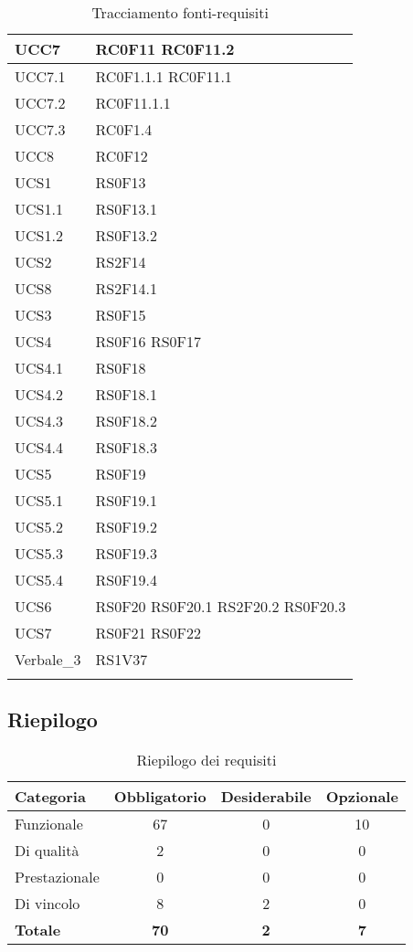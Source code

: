 \begin{center}
\begin{longtable}{|p{5cm}|p{5cm}|}
UCC7		& RC0F11 \newline RC0F11.2 \\\hline
UCC7.1		& RC0F1.1.1 \newline RC0F11.1 \\\hline
UCC7.2		& RC0F11.1.1 \\\hline
UCC7.3		& RC0F1.4 \\\hline
UCC8		& RC0F12 \\\hline
UCS1		& RS0F13 \\\hline
UCS1.1		& RS0F13.1 \\\hline
UCS1.2		& RS0F13.2 \\\hline
UCS2		& RS2F14 \\\hline
UCS8		& RS2F14.1 \\\hline
UCS3		& RS0F15 \\\hline
UCS4		& RS0F16 \newline RS0F17 \\\hline
UCS4.1		& RS0F18 \\\hline
UCS4.2		& RS0F18.1 \\\hline
UCS4.3		& RS0F18.2 \\\hline
UCS4.4		& RS0F18.3 \\\hline
UCS5		& RS0F19 \\\hline
UCS5.1		& RS0F19.1 \\\hline
UCS5.2		& RS0F19.2 \\\hline
UCS5.3		& RS0F19.3 \\\hline
UCS5.4		& RS0F19.4 \\\hline
UCS6		& RS0F20 \newline RS0F20.1 \newline RS2F20.2 \newline RS0F20.3 \\\hline
UCS7		& RS0F21 \newline RS0F22 \\\hline
Verbale\_3	& RS1V37 \\\hline
\caption{Tracciamento fonti-requisiti}
\end{longtable}
\egroup
\end{center}

\subsection{Riepilogo}
\begin{table}[h]
\begin{center}
\begin{tabular}{|l|c|c|c|}
\hline
\textbf{Categoria} & \textbf{Obbligatorio} & \textbf{Desiderabile} & \textbf{Opzionale} \\
\hline
Funzionale		&	67	&	0	&	10	\\
\hline
Di qualità		&	2	&	0	&	0	\\
\hline
Prestazionale	&	0	&	0	&	0	\\
\hline
Di vincolo		&	8	&	2	&	0	\\
\hline
\textbf{Totale} & \textbf{70} & \textbf{2} & \textbf{7} \\
\hline
\end{tabular}
\end{center}
\caption{Riepilogo dei requisiti}
\end{table}

